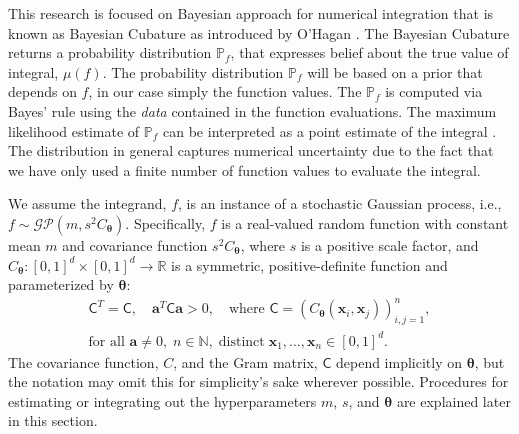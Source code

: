 \documentclass{iitthesis}          %
\newcommand{\bm}[1]{\boldsymbol{#1}}
\newcommand{\vtheta}{{\bm{\theta}}}
\newcommand{\va}{\bm{a}}
\newcommand{\vx}{\bm{x}}
\newcommand{\mC}{\mathsf{C}}
\begin{document}
This research is focused on Bayesian approach for numerical integration that is known as Bayesian Cubature as introduced by O'Hagan \cite{OHagen1991}. 
The Bayesian Cubature returns a probability distribution $\mathbb{P}_f$, that expresses belief about the true value of integral, $\mu(f)$.
The probability distribution $\mathbb{P}_f$ will be based on a prior that depends on $f$, in our case simply the function values. 
The $\mathbb{P}_f$ is computed via Bayes' rule using  the \emph{data} contained in the function evaluations. 
The maximum likelihood estimate of $\mathbb{P}_f$ can be interpreted as a point estimate of the integral \cite{BriEtal18a}. The distribution in general captures numerical uncertainty due to the fact that we have only used a finite number of function values to evaluate the integral.

\label{sec:BayesPostErr}

We assume the integrand, $f$, is an instance of a stochastic Gaussian process, i.e., $f \sim \mathcal{GP}(m,s^2 C_\vtheta)$.  Specifically, $f$ is a real-valued random function with constant mean $m$ and covariance function $s^2C_\vtheta$, where $s$ is a positive scale factor, and $C_\vtheta: [0,1]^d \times [0,1]^d \to \mathbb{R} $ is a symmetric, positive-definite function and parameterized by $\vtheta$:
\begin{multline} \label{FJH:eq:CondPosDef}
\mC^T = \mC,  \quad \va^T \mC \va > 0, \quad \text{where }  \mC = \left(  C_\vtheta(\vx_i,\vx_j)  \right)_{i,j=1}^n,\\
 \text{for all } \va \ne 0, \;
 n\in \mathbb{N}, \; \text{distinct} \; \vx_1, \ldots, \vx_n \in [0,1]^d.
\end{multline}
The covariance function, $C$, and the Gram matrix, $\mC$ depend implicitly on $\vtheta$, but the notation may omit this for simplicity's sake wherever possible.
Procedures for estimating or integrating out the hyperparameters $m$, $s$, and $\vtheta$ are explained later in this section.
\end{document}
